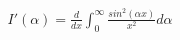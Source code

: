 \documentclass[preview]{standalone}
\begin{document}
\begin{align*}
I'(\alpha) = \frac{d}{dx}\int_{0}^{\infty}\frac{sin^2(\alpha x)}{x^2}d\alpha
\end{align*}
\end{document}
